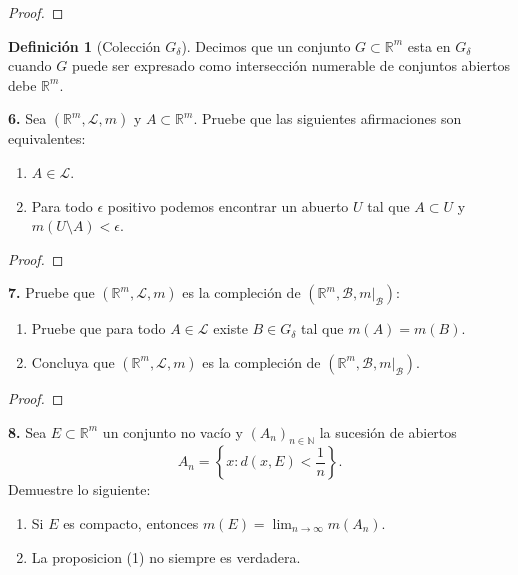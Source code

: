 \documentclass{article}
\newenvironment{statement}[1]{\smallskip\noindent\color[rgb]{1.00,0.00,0.50} {\bf #1.}}{}
\theoremstyle{definition}
\newtheorem{defn}[theorem]{Definici\'on}
\theoremstyle{remark}
\newcommand{\BR}{\mathbb R}
\newcommand{\BN}{\mathbb N}
\begin{document}
\begin{proof}
\end{proof}

\begin{defn}[Colecci\'on $G_{\delta}$]
  Decimos que un conjunto $G \subset \BR^m$ esta en $G_{\delta}$ cuando $G$
  puede ser expresado como intersecci\'on numerable de conjuntos abiertos debe
  $\BR^m$.
\end{defn}

\begin{statement}{6}
  Sea $(\BR^m, \mathcal{L}, m)$ y $A \subset \BR^m$.
  Pruebe que las siguientes afirmaciones son equivalentes:
  \begin{enumerate}
    \item $A \in \mathcal{L}$.
    \item Para todo $\epsilon$ positivo podemos encontrar un abuerto $U$ tal
    que $A \subset U$ y $m(U \setminus A) < \epsilon$.
  \end{enumerate}
\end{statement}

\begin{proof}
\end{proof}

\begin{statement}{7}
  Pruebe que $(\BR^m, \mathcal{L}, m)$ es la compleción de
  $(\BR^m, \mathcal{B}, m |_{\mathcal{B}})$:
  \begin{enumerate}
    \item Pruebe que para todo $A \in \mathcal{L}$ existe $B \in G_{\delta}$
    tal que $m(A) = m(B)$.
    \item Concluya que $(\BR^m, \mathcal{L}, m)$ es la compleci\'on de
    $(\BR^m, \mathcal{B}, m |_{\mathcal{B}})$.
  \end{enumerate}
\end{statement}

\begin{proof}
\end{proof}

\begin{statement}{8}
  Sea $E \subset \BR^m$ un conjunto no vac\'io y $(A_n)_{n \in \BN}$ la
  sucesi\'on de abiertos
  \[
    A_n = \left\{x : d(x, E) < \frac{1}{n}\right\}.
  \]
  Demuestre lo siguiente:
  \begin{enumerate}
    \item Si $E$ es compacto, entonces $m(E) = \lim_{n \to \infty} m(A_n)$.
    \item La proposicion (1) no siempre es verdadera.
  \end{enumerate}
\end{statement}
\end{document}
